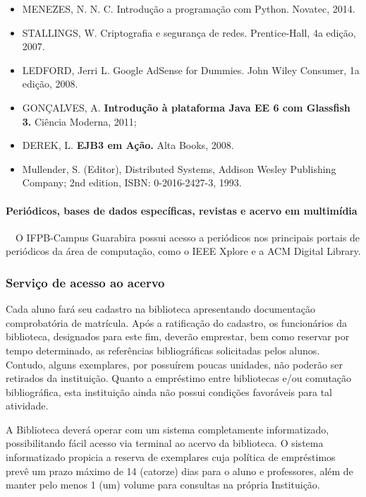 \begin{itemize}
    \item MENEZES, N. N. C.
          Introdução a programação com Python.
          Novatec, 2014.
    \item STALLINGS, W.
          Criptografia e segurança de redes.
          Prentice-Hall, 4a edição, 2007.

    \item LEDFORD, Jerri L.
          Google AdSense for Dummies.
          John Wiley Consumer, 1a edição, 2008.
	\item 	GONÇALVES, A. \textbf{Introdução à plataforma Java EE 6 com Glassfish 3.} Ciência Moderna, 2011;
	\item 	DEREK, L. \textbf{EJB3 em Ação.} Alta Books, 2008.
	\item Mullender, S. (Editor), Distributed Systems, Addison Wesley Publishing Company; 2nd edition, ISBN: 0-2016-2427-3, 1993.
\end{itemize}

\paragraph{Periódicos, bases de dados específicas, revistas e acervo em multimídia}\
\
O IFPB-Campus Guarabira possui acesso a periódicos nos principais portais de periódicos da área de computação, como o IEEE Xplore e a ACM Digital Library.

\subsubsection{Serviço de acesso ao acervo}

Cada aluno fará seu cadastro na biblioteca apresentando documentação comprobatória de matrícula. Após a ratificação do cadastro, os funcionários da biblioteca, designados para este fim, deverão emprestar, bem como reservar por tempo determinado, as referências bibliográficas solicitadas pelos alunos. Contudo, alguns exemplares, por possuírem poucas unidades, não poderão ser retirados da instituição. Quanto a empréstimo entre bibliotecas e/ou comutação bibliográfica, esta instituição ainda não possui condições favoráveis para  tal atividade.

A Biblioteca deverá operar com um sistema completamente informatizado, possibilitando fácil acesso via terminal ao acervo da biblioteca. O sistema informatizado propicia a reserva de exemplares cuja política de empréstimos prevê um prazo máximo de 14 (catorze) dias para o aluno e professores, além de manter pelo menos 1 (um) volume para consultas na própria Instituição. 


